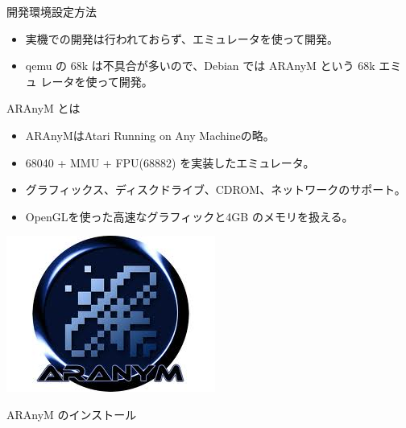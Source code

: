 \begin{frame}{開発環境設定方法}

\begin{itemize}
\item 実機での開発は行われておらず、エミュレータを使って開発。
\item qemu の 68k は不具合が多いので、Debian では ARAnyM という 68k エミュ
      レータを使って開発。
\end{itemize}

\end{frame}

\begin{frame}{ARAnyM とは}

\begin{minipage}{0.6\hsize}
\begin{itemize}
\item ARAnyMはAtari Running on Any Machineの略。
\item 68040 + MMU + FPU(68882) を実装したエミュレータ。
\item グラフィックス、ディスクドライブ、CDROM、ネットワークのサポート。
\item OpenGLを使った高速なグラフィックと4GB のメモリを扱える。
\end{itemize}
\end{minipage}
\begin{minipage}{0.3\hsize}
\includegraphics[width=0.9\hsize]{image201105/aranym.jpg}
\end{minipage}
\end{frame}

\begin{frame}[containsverbatim]{ARAnyM のインストール}


\end{frame}

